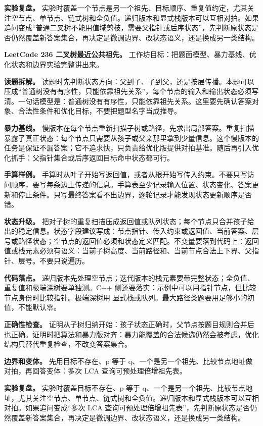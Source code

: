 \textbf{实验复盘。} 实验时覆盖一个节点是另一个祖先、目标顺序、重复值约定，尤其关注空节点、单节点、链式树和全负值。递归版本和显式栈版本可以互相对拍。如果追问变成“普通二叉树不能用值域剪枝，需要父指针或后序状态”，先判断原状态是否仍然覆盖新答案集合，再决定是微调边界、改状态语义，还是换成另一类结构。

\noindent\textbf{LeetCode 236 二叉树最近公共祖先。} 工作坊目标：把题面模型、暴力基线、优化状态和边界实验完整讲出来。

\textbf{读题拆解。} 读题时先判断状态方向：父到子、子到父，还是按层传播。本题可以压成“普通树没有有序性，只能依靠祖先关系”，每个节点的输入和输出状态必须写清。一句话模型是：普通树没有有序性，只能依靠祖先关系。这里要先确认答案对象、合法性条件和优化目标，不要把题型名字当成推导。

\textbf{暴力基线。} 慢版本在每个节点重新扫描子树或路径，先求出局部答案。重复扫描暴露了真正状态：每个节点只需要从孩子或父亲那里拿到少量信息。这个慢版本的任务是保证不漏答案；它不追求快，只负责给优化版提供对拍基准。随后再引入优化抓手：父指针集合或后序返回目标命中状态都可行。

\textbf{手算样例。} 手算时从叶子开始写返回值，或者从根开始写传入约束。不要只写访问顺序，要写每条边上传递的信息。手算表至少记录输入位置、状态变化、答案更新和停止条件。只写最终答案看不出边界，逐轮记录才能发现状态更新顺序是否错。

\textbf{状态升级。} 把对子树的重复扫描压成返回值或队列状态；每个节点只合并孩子给出的稳定信息。状态字段建议写成：节点指针、传入约束或返回值、当前答案、层号或路径状态；空节点的返回值必须和状态定义匹配。不变量要落到代码上：返回值或栈元素必须有语义：当前子树高度、当前路径和、当前节点合法上下界、父指针、层号。不要只说遍历。

\textbf{代码落点。} 递归版本先处理空节点；迭代版本的栈元素要带完整状态；全负值、重复值和极端深树要单独测。C++ 侧还要落实：示例中可以用指针节点，但比较节点身份时比较指针。极端深树用  显式栈或队列。最大路径类题要用足够小的初值，不能默认零。

\textbf{正确性检查。} 证明从子树归纳开始：孩子状态正确时，父节点按题目规则合并后也正确。证明时把算法和暴力版对齐：暴力能覆盖的合法候选仍然会被考虑，优化结构只替代重复检查，不改变答案集合。

\textbf{边界和变体。} 先用目标不存在、p 等于 q、一个是另一个祖先、比较节点地址做对拍，再回答变体：多次 LCA 查询可预处理倍增祖先表。

\textbf{实验复盘。} 实验时覆盖目标不存在、p 等于 q、一个是另一个祖先、比较节点地址，尤其关注空节点、单节点、链式树和全负值。递归版本和显式栈版本可以互相对拍。如果追问变成“多次 LCA 查询可预处理倍增祖先表”，先判断原状态是否仍然覆盖新答案集合，再决定是微调边界、改状态语义，还是换成另一类结构。

